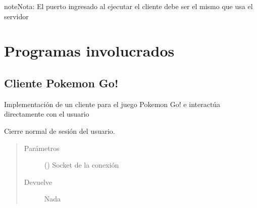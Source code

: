 \documentclass[letterpaper,10pt,spanish,openany,oneside]{sphinxmanual}
\begin{document}
\begin{sphinxadmonition}{note}{Nota:}
El puerto ingresado al ejecutar el cliente debe ser el mismo que usa el servidor
\end{sphinxadmonition}


\chapter{Programas involucrados}
\label{\detokenize{index:programas-involucrados}}

\section{Cliente Pokemon Go!}
\label{\detokenize{pokemonClient:cliente-pokemon-go}}\label{\detokenize{pokemonClient::doc}}
Implementación de un cliente para el juego Pokemon Go! e interactúa directamente con el usuario

\label{\detokenize{pokemonClient:module-pokemonClient}}

\begin{fulllineitems}
\label{\detokenize{pokemonClient:pokemonClient.cerrarSesion}}
Cierre normal de sesión del usuario.
\begin{quote}\begin{description}
\item[{Parámetros}] \leavevmode
{} () \textendash{} Socket de la conexión

\item[{Devuelve}] \leavevmode
Nada

\end{description}\end{quote}

\end{fulllineitems}

\end{document}
